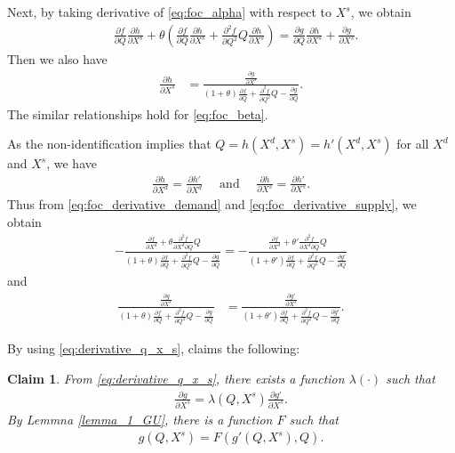 \documentclass[11pt, a4paper]{article}
\newtheorem{claim}{Claim}
\theoremstyle{remark}
\begin{document}
Next, by taking derivative of \eqref{eq:foc_alpha} with respect to $X^{s}$, we obtain
\begin{align}
    & \frac{\partial f}{\partial Q}\frac{\partial h}{\partial X^{s}} + \theta \left(\frac{\partial f}{\partial Q}\frac{\partial h}{\partial X^{s}}  + \frac{\partial^2 f}{\partial Q^2}Q\frac{\partial h}{\partial X^{s}} \right) =  \frac{\partial g}{\partial Q}\frac{\partial h}{\partial X^{s}} + \frac{\partial g}{\partial X^{s}}.
\end{align}
Then we also have
\begin{align}
    \frac{\partial h}{\partial X^{s}} & = \frac{\frac{\partial g}{\partial X^{s}}}{(1+\theta)\frac{\partial f}{\partial Q} + \frac{\partial^2 f}{\partial Q^2}Q - \frac{\partial g}{\partial Q}}. \label{eq:foc_derivative_supply}
\end{align}
The similar relationships hold for \eqref{eq:foc_beta}.

As the non-identification implies that $Q = h(X^{d}, X^{s}) = h'(X^{d}, X^{s})$ for all $X^{d}$ and $X^{s}$, we have
\begin{align}
    \frac{\partial h}{\partial X^{d}}  = \frac{\partial h'}{\partial X^{d}}\quad \text{  and  } \quad \frac{\partial h}{\partial X^{s}}  = \frac{\partial h'}{\partial X^{s}}.
\end{align}
Thus from \eqref{eq:foc_derivative_demand} and \eqref{eq:foc_derivative_supply}, we obtain
\begin{align}
     - \frac{\frac{\partial f}{\partial X^{d}} + \theta \frac{\partial^2 f}{\partial X^{d}\partial Q}Q }{(1+\theta)\frac{\partial f}{\partial Q} + \frac{\partial^2 f}{\partial Q^2}Q - \frac{\partial g}{\partial Q}} = - \frac{\frac{\partial f}{\partial X^{d}} + \theta' \frac{\partial^2 f}{\partial X^{d}\partial Q}Q }{(1+\theta')\frac{\partial f}{\partial Q} + \frac{\partial^2 f}{\partial Q^2}Q - \frac{\partial g'}{\partial Q}}\label{eq:derivative_q_x_d}
\end{align}
and
\begin{align}
    \frac{\frac{\partial g}{\partial X^{s}}}{(1+\theta)\frac{\partial f}{\partial Q} + \frac{\partial^2 f}{\partial Q^2}Q - \frac{\partial g}{\partial Q}} & = \frac{\frac{\partial g'}{\partial X^{s}}}{(1+\theta')\frac{\partial f}{\partial Q} + \frac{\partial^2 f}{\partial Q^2}Q - \frac{\partial g'}{\partial Q}}.\label{eq:derivative_q_x_s}
\end{align}


By using \eqref{eq:derivative_q_x_s}, \citet{lau1982identifying} claims the following:
\begin{claim}
    From \eqref{eq:derivative_q_x_s}, there exists a function $\lambda(\cdot)$ such that
    \begin{align}
        \frac{\partial g}{\partial X^{s}} = \lambda(Q, X^{s}) \frac{\partial g'}{\partial X^{s}}. \label{eq:transformation_g}
    \end{align}
    By Lemmna \ref{lemma_1_GU}, there is a function $F$ such that
    \begin{align}
        g(Q,X^{s}) = F(g'(Q,X^{s}), Q).
    \end{align}
\end{claim}
\end{document}
